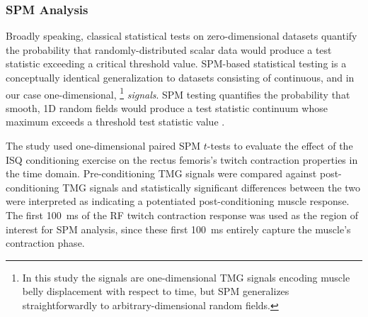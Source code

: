 \documentclass[utf8]{FrontiersinHarvard}
\begin{document}
\subsubsection{SPM Analysis} \label{sss:spm_analysis}
Broadly speaking, classical statistical tests on zero-dimensional datasets quantify the probability that randomly-distributed scalar data would produce a test statistic exceeding a critical threshold value.
SPM-based statistical testing is a conceptually identical generalization to datasets consisting of continuous, and in our case one-dimensional,%
\footnote{In this study the signals are one-dimensional TMG signals encoding muscle belly displacement with respect to time, but SPM generalizes straightforwardly to arbitrary-dimensional random fields.}
\textit{signals}.
SPM testing quantifies the probability that smooth, 1D random fields would produce a test statistic continuum whose maximum exceeds a threshold test statistic value \citep{pataky-spm1d, pataky-roi, pataky}.

The study used one-dimensional paired SPM $ t $-tests to evaluate the effect of the ISQ conditioning exercise on the rectus femoris's twitch contraction properties in the time domain.
Pre-conditioning TMG signals were compared against post-conditioning TMG signals and statistically significant differences between the two were interpreted as indicating a potentiated post-conditioning muscle response.
The first \SI{100}{\milli \second} of the RF twitch contraction response was used as the region of interest for SPM analysis, since these first \SI{100}{\milli \second} entirely capture the muscle's contraction phase.
\end{document}
